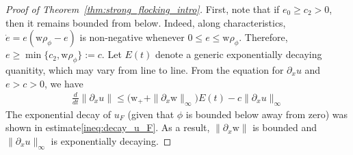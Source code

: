 \documentclass[11pt,letterpaper]{amsart}
\theoremstyle{plain}
\theoremstyle{definition}
\theoremstyle{remark}
\newcommand{\thm}[1]{Theorem~\ref{#1}}
\renewcommand{\geq}{\geqslant}
\renewcommand{\leq}{\leqslant}
\def \wt {\mathrm{w}}
\begin{document}
\begin{proof}[Proof of \thm{thm:strong_flocking_intro}]
    First, note that if $e_0 \geq c_2 > 0$, then it remains bounded from below.  
    Indeed, along characteristics, $\dot{e} = e(\wt \rho_{\phi} - e)$ is non-negative 
    whenever $0 \leq e \leq \wt \rho_{\phi}$.  Therefore, $e \geq \min\{ c_2, \wt \rho_{\phi} \} := c$.  
    Let $E(t)$ denote a generic exponentially decaying 
    quanitity, which may vary from line to line. From the equation for $\partial_x u$ and $e > c > 0$, we have 
    \begin{align*}
        \frac{d}{dt} \|\partial_x u\| \leq \big( \wt_+ + \| \partial_x \wt \|_{\infty} \big) E(t) - c \|\partial_x u\|_{\infty} 
    \end{align*}
    The exponential decay of $u_F$ (given that $\phi$ is bounded below away from zero) was shown in estimate\eqref{ineq:decay_u_F}. 
    As a result, $\|\partial_x \wt\|$ is bounded and $\|\partial_x u\|_{\infty}$ is exponentially decaying. 
    

\end{proof}
\end{document}
